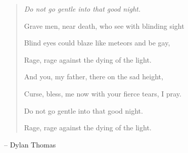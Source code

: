 \documentclass[
    a4paper, %
    fontsize=10pt, %
    twoside=false, %
	numbers=noenddot, %
]{kaobook}
\newenvironment{itquote}
  {\begin{quote}\itshape}
  {\end{quote}\ignorespacesafterend}
\begin{document}
{\begin{itquote}
Do not go gentle into that good night.

\vspace{15px}

Grave men, near death, who see with blinding sight

Blind eyes could blaze like meteors and be gay,

Rage, rage against the dying of the light.

\vspace{15px}

And you, my father, there on the sad height,

Curse, bless, me now with your fierce tears, I pray.

Do not go gentle into that good night.

Rage, rage against the dying of the light.	
	
\end{itquote}
	\flushright -- Dylan Thomas
	
}






\maketitle
{}




\end{document}
